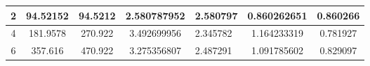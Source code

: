 \begin{table}
{\begin{tabular}{|c|c|c|c|l|c|c|}
2                                                                                          & 94.52152                                                                                                                                                                                                                       & 94.5212                                                                                                                                                                                                                      & 2.580787952                                                                                                                     & 2.580797                                                                                                                                              & 0.860262651                                                                                & 0.860266                                                                                   \\ \hline
4                                                                                          & 181.9578                                                                                                                                                                                                                       & 270.922                                                                                                                                                                                                                      & 3.492699956                                                                                                                     & 2.345782                                                                                                                                              & 1.164233319                                                                                & 0.781927                                                                                   \\ \hline
6                                                                                          & 357.616                                                                                                                                                                                                                        & 470.922                                                                                                                                                                                                                      & 3.275356807                                                                                                                     & 2.487291                                                                                                                                              & 1.091785602                                                                                & 0.829097                                                                                   \\ \hline

\end{tabular}}
\end{table}
